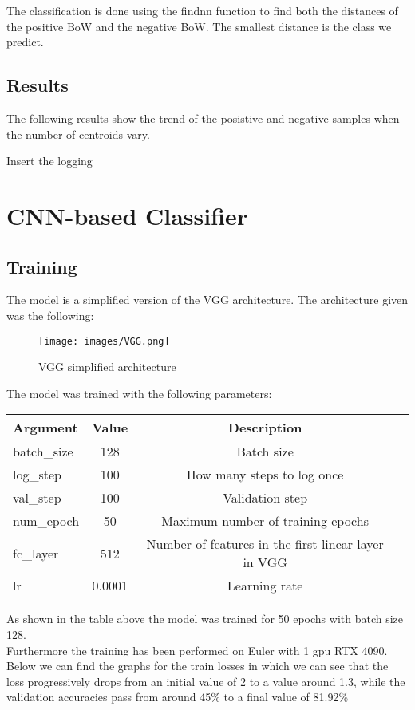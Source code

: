 \documentclass{ETHExercise}
\begin{document}
The classification is done using the findnn function to find both the 
distances of the positive BoW and the negative BoW. The smallest distance
is the class we predict.

\subsection{Results}
The following results show the trend of the posistive and negative samples when the number
of centroids vary.

Insert the logging

\section{CNN-based Classifier}

\subsection{Training}
The model is a simplified version of the VGG architecture. The architecture given was
the following:

\begin{figure}[!h]
  \centering
  \texttt{[image: images/VGG.png]}
  \caption{VGG simplified architecture}
\end{figure}

The model was trained with the following parameters:
\begin{center}
  \begin{tabular}{|l|c|c|c|}
    \hline
    \textbf{Argument} & \textbf{Value} &  \textbf{Description} \\
    \hline
    batch\_size & 128 & Batch size \\
    log\_step & 100 & How many steps to log once \\
    val\_step & 100 &  Validation step \\
    num\_epoch & 50 & Maximum number of training epochs \\
    fc\_layer & 512 & Number of features in the first linear layer in VGG \\
    lr & 0.0001 &  Learning rate \\
    \hline
  \end{tabular}
\end{center}


As shown in the table above the model was trained for 50 epochs with batch size 128.
\\
Furthermore the training has been performed on Euler with 1 gpu RTX 4090. 
\\
Below we can find the graphs for the train losses in which we can see that the 
loss progressively drops from an initial value of 2 to a value around 1.3, while the validation accuracies
pass from around 45\% to a final value of 81.92\%
\end{document}
